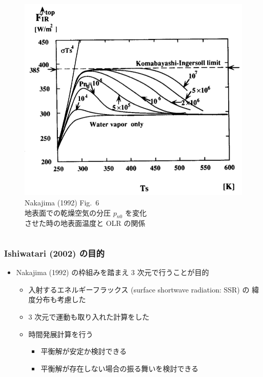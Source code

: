 \documentclass[aspectratio=149,9pt,fleqn]{beamer}
\begin{document}
\begin{frame}
\begin{columns}[T,onlytextwidth]
\begin{column}{.4\textwidth}
\begin{figure}
				\includegraphics[width=\textwidth]{nf6.png}\\
				Nakajima \etal (1992) Fig.\ 6\\
				地表面での乾燥空気の分圧 \(p_{n0}\) を変化\\
				させた時の地表面温度と OLR の関係
			\end{figure}
		\end{column}
	\end{columns}
\end{frame}

\begin{frame}
	\frametitle{Ishiwatari \etal (2002) の目的}
	\begin{itemize}
		\item Nakajima \etal (1992) の枠組みを踏まえ 3 次元で行うことが目的
			\begin{itemize}
				\item 入射するエネルギーフラックス (surface shortwave radiation: SSR) の
					緯度分布も考慮した
				\item 3 次元で運動も取り入れた計算をした
				\item 時間発展計算を行う
					\begin{itemize}
						\item 平衡解が安定か検討できる
						\item 平衡解が存在しない場合の振る舞いを検討できる
					\end{itemize}
			\end{itemize}
	\end{itemize}
\end{frame}
\end{document}
